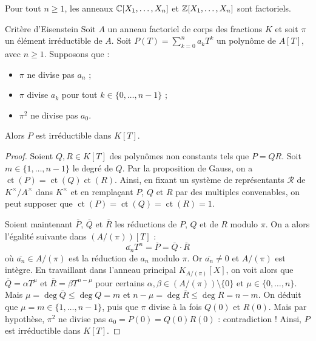 \documentclass[]{report}
\begin{document}
\begin{ex}{}{}
    Pour tout $n \ge 1$, les anneaux $\mathbb{C}[X_1, \dots, X_n]$ et $\mathbb{Z}[X_1, \dots, X_n]$ sont factoriels.
\end{ex}

\begin{tm}{Critère d'Eisenstein}{}
    Soit $A$ un anneau factoriel de corps des fractions $K$ et soit $\pi$ un élément irréductible de $A$. Soit $P(T) = \sum_{k=0}^{n} a_k T^k$ un polynôme de $A[T]$, avec $n \ge 1$. Supposons que :
    \begin{itemize}
        \item[(a)] $\pi$ ne divise pas $a_n$ ;
        \item[(b)] $\pi$ divise $a_k$ pour tout $k \in \{0, \dots, n - 1\}$ ;
        \item[(c)] $\pi^2$ ne divise pas $a_0$.
    \end{itemize}
    Alors $P$ est irréductible dans $K[T]$.
\end{tm}

\begin{proof}
    Soient $Q, R \in K[T]$ des polynômes non constants tels que $P = QR$. Soit $m \in \{1, \dots, n-1\}$ le degré de $Q$. Par la proposition de Gauss, on a $\operatorname{ct}(P) = \operatorname{ct}(Q)\operatorname{ct}(R)$. Ainsi, en fixant un système de représentants $\mathcal{R}$ de $K^{\times}/A^{\times}$ dans $K^{\times}$ et en remplaçant $P$, $Q$ et $R$ par des multiples convenables, on peut supposer que $\operatorname{ct}(P) = \operatorname{ct}(Q) = \operatorname{ct}(R) = 1$.

    Soient maintenant $\overline{P}$, $\overline{Q}$ et $\overline{R}$ les réductions de $P$, $Q$ et de $R$ modulo $\pi$. On a alors l'égalité suivante dans $(A/(\pi))[T]$ :
    \[\overline{a_n} T^n = \overline{P} = \overline{Q} \cdot \overline{R}\]
    où $\overline{a_n} \in A/(\pi)$ est la réduction de $a_n$ modulo $\pi$. Or $\overline{a_n} \neq 0$ et $A/(\pi)$ est intègre. En travaillant dans l'anneau principal $K_{A/(\pi)}[X]$, on voit alors que $\overline{Q} = \alpha T^\mu$ et $\overline{R} = \beta T^{n - \mu}$ pour certains $\alpha, \beta \in (A/(\pi)) \setminus \{0\}$ et $\mu \in \{0, \dots, n\}$. Mais $\mu = \deg \bar{Q} \le \deg Q = m$ et $n - \mu = \deg \bar{R} \le \deg R = n - m$. On déduit que $\mu = m \in \{1, \dots, n - 1\}$, puis que $\pi$ divise à la fois $Q(0)$ et $R(0)$. Mais par hypothèse, $\pi^2$ ne divise pas $a_0 = P(0) = Q(0)R(0)$ : contradiction ! Ainsi, $P$ est irréductible dans $K[T]$.
\end{proof}
\end{document}
